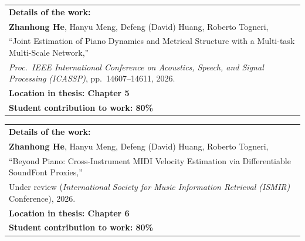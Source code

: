 \vskip 0.6cm

\begin{tabular}{@{}p{\dimexpr\textwidth-2\tabcolsep\relax}@{}}
\textbf{Details of the work:} \\
\textbf{Zhanhong He}, Hanyu Meng, Defeng (David) Huang, Roberto Togneri,\\
``Joint Estimation of Piano Dynamics and Metrical Structure with a Multi-task Multi-Scale Network,''\\
\emph{Proc.\ IEEE International Conference on Acoustics, Speech, and Signal Processing (ICASSP)},
pp.~14607--14611, 2026.\\
\textbf{Location in thesis: Chapter 5} \\
\textbf{Student contribution to work: 80\%}\\
\end{tabular} 
	
\vskip 0.6cm
	
\begin{tabular}{@{}p{\dimexpr\textwidth-2\tabcolsep\relax}@{}}
\textbf{Details of the work:} \\
\textbf{Zhanhong He}, Hanyu Meng, Defeng (David) Huang, Roberto Togneri,\\
``Beyond Piano: Cross-Instrument MIDI Velocity Estimation via Differentiable SoundFont Proxies,''\\
Under review (\emph{International Society for Music Information Retrieval (ISMIR)} Conference), 2026.\\
\textbf{Location in thesis: Chapter 6} \\
\textbf{Student contribution to work: 80\%}\\
\end{tabular} 

